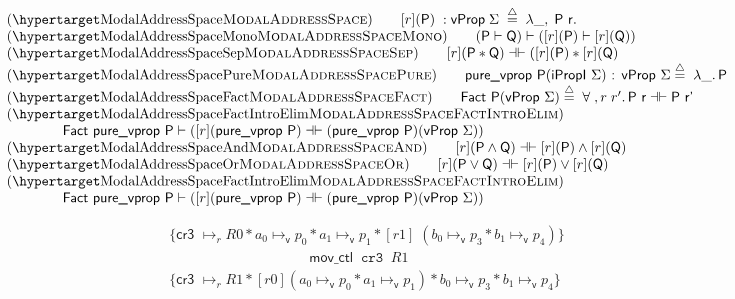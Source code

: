\begin{figure}
\[
  \begin{array}{l}
    \hbox{(\TirNameStyle{ModalAddressSpace})} \qquad
         [r](\mathsf{P}) \;: \mathsf{vProp} \; \Sigma \; \stackrel{\triangle}{=} \; \lambda \_,\; \mathsf{P}~\mathsf{r}.\\
    \hbox{(\TirNameStyle{ModalAddressSpaceMono})} \qquad (\textsf{P} \vdash \textsf{Q}) \vdash  ([r](\textsf{P}) \vdash  [r](\textsf{Q}))\\
    \hbox{(\TirNameStyle{ModalAddressSpaceSep})} \qquad [r](\textsf{P} \ast \textsf{Q}) \dashv\vdash ([r](\textsf{P}) \ast [r](\textsf{Q})\\
    \hbox{(\TirNameStyle{ModalAddressSpacePure})} \qquad  \textsf{pure\_vprop P}(\textsf{iPropI }\Sigma)\textsf{ : vProp }\Sigma \stackrel{\triangle}{=} \; \lambda \_ \ldotp \textsf{P}\\
    \hbox{(\TirNameStyle{ModalAddressSpaceFact})} \qquad  \textsf{Fact P}(\textsf{vProp }\Sigma) \stackrel{\triangle}{=} \;\forall \; ,r \; r' \ldotp  \textsf{P r} \dashv\vdash \textsf{P r'}\\
    \hbox{(\TirNameStyle{ModalAddressSpaceFactIntroElim})} \\
    \qquad\qquad \textsf{Fact pure\_vprop P} \vdash  ([r](\textsf{pure\_vprop P}) \dashv\vdash (\textsf{pure\_vprop P}) (\textsf{vProp }\Sigma))\\
    
    \hbox{(\TirNameStyle{ModalAddressSpaceAnd})} \qquad   [r](\textsf{P}\land \textsf{Q}) \dashv\vdash [r](\textsf{P})\land [r](\textsf{Q})\\    
    \hbox{(\TirNameStyle{ModalAddressSpaceOr})} \qquad    [r](\textsf{P}\lor \textsf{Q}) \dashv\vdash [r](\textsf{P})\lor [r](\textsf{Q})\\   
    \hbox{(\TirNameStyle{ModalAddressSpaceFactIntroElim})} \\
    \qquad\qquad \textsf{Fact pure\_vprop P} \vdash  ([r](\textsf{pure\_vprop P}) \dashv\vdash (\textsf{pure\_vprop P}) (\textsf{vProp }\Sigma))\\
    
  \end{array}
  \]
  \label{fig:modaldef}
  \end{figure}
  
\begin{figure}
\[
\begin{array}{l}
  \{ \textsf{cr3 } \mapsto_{r} R0 \ast a_0 \mapsto_{\textsf{v}}p_0  \ast a_1 \mapsto_{\textsf{v}}p_1  \ast [r1]\;( b_0 \mapsto_{\textsf{v}}p_3  \ast b_1 \mapsto_{\textsf{v}}p_4 )\}\\
  \qquad \qquad \qquad \qquad \qquad \mathsf{mov\_ctl} \;\; \texttt{cr3} \; \; R1\\

  \{ \textsf{cr3 } \mapsto_{r} R1 \ast [r0](a_0 \mapsto_{\textsf{v}}p_0  \ast a_1 \mapsto_{\textsf{v}}p_1)  \ast  b_0 \mapsto_{\textsf{v}}p_3  \ast b_1 \mapsto_{\textsf{v}}p_4 \}
  \end{array}
\]
  \label{fig:addrswitch}
  \end{figure}


